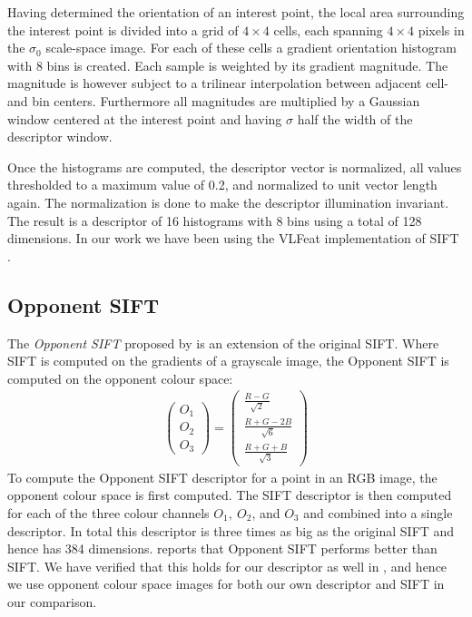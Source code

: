 \documentclass[thesis.tex]{subfiles}
\begin{document}
Having determined the orientation of an interest point, the local area surrounding the interest point is divided into a grid of $4 \times 4$ cells, each spanning $4 \times 4$ pixels in the $\sigma_0$ scale-space image. For each of these cells a gradient orientation histogram with 8 bins is created. Each sample is weighted by its gradient magnitude. The magnitude is however subject to a trilinear interpolation between adjacent cell- and bin centers. Furthermore all magnitudes are multiplied by a Gaussian window centered at the interest point and having $\sigma$ half the width of the descriptor window.

Once the histograms are computed, the descriptor vector is normalized, all values thresholded to a maximum value of 0.2, and normalized to unit vector length again. The normalization is done to make the descriptor illumination invariant.
The result is a descriptor of 16 histograms with 8 bins using a total of 128 dimensions. In our work we have been using the VLFeat implementation of SIFT \cite{vedaldi2008vlfeat}.

\subsection{Opponent SIFT}
\label{sec:opponentColourSpace}

The \emph{Opponent SIFT} proposed by \citet{van2010evaluating} is an extension of the original SIFT. Where SIFT is computed on the gradients of a grayscale image, the Opponent SIFT is computed on the opponent colour space:
\begin{align*}
	\begin{pmatrix} O_1 \\ O_2 \\ O_3 \end{pmatrix} =
		\begin{pmatrix}
			\frac{R-G}{\sqrt{2}} \\
			\frac{R+G-2B}{\sqrt{6}} \\
			\frac{R+G+B}{\sqrt{3}}
		\end{pmatrix}
\end{align*}
To compute the Opponent SIFT descriptor for a point in an RGB image, the opponent colour space is first computed. The SIFT descriptor is then computed for each of the three colour channels $O_1,~O_2$, and $O_3$ and combined into a single descriptor. In total this descriptor is three times as big as the original SIFT and hence has 384 dimensions. \citet{van2010evaluating} reports that Opponent SIFT performs better than SIFT. We have verified that this holds for our descriptor as well in , and hence we use opponent colour space images for both our own descriptor and SIFT in our comparison.
\end{document}

